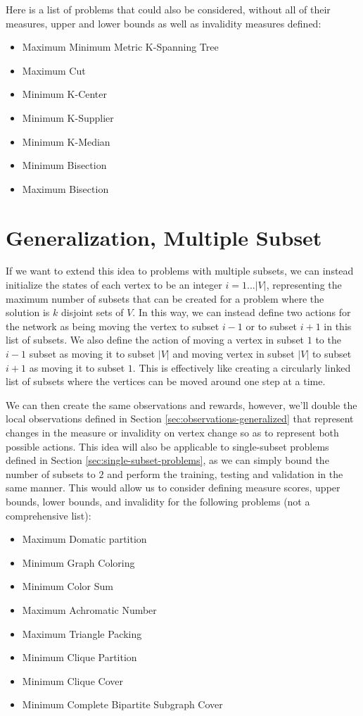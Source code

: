\documentclass{article}
\begin{document}
    Here is a list of problems that could also be considered, without all of their measures, upper and lower bounds as well as invalidity measures defined:
    \begin{itemize}
        \item Maximum Minimum Metric K-Spanning Tree 
        \item Maximum Cut 
        \item Minimum K-Center
        \item Minimum K-Supplier
        \item Minimum K-Median
        \item Minimum Bisection
        \item Maximum Bisection
    \end{itemize}

\section{Generalization, Multiple Subset}\label{sec:multi-subset}

If we want to extend this idea to problems with multiple subsets, we can instead initialize the states of each vertex to be an integer $i = 1 ... |V|$, representing the maximum number of subsets that can be created for a problem where the solution is $k$ disjoint sets of $V$. In this way, we can instead define two actions for the network as being moving the vertex to subset $i - 1$ or to subset $i + 1$ in this list of subsets. We also define the action of moving a vertex in subset $1$ to the $i - 1$ subset as moving it to subset $|V|$ and moving vertex in subset $|V|$ to subset $i+1$ as moving it to subset $1$. This is effectively like creating a circularly linked list of subsets where the vertices can be moved around one step at a time. 

We can then create the same observations and rewards, however, we'll double the local observations defined in Section \ref{sec:observations-generalized} that represent changes in the measure or invalidity on vertex change so as to represent both possible actions. This idea will also be applicable to single-subset problems defined in Section \ref{sec:single-subset-problems}, as we can simply bound the number of subsets to $2$ and perform the training, testing and validation in the same manner. This would allow us to consider defining measure scores, upper bounds, lower bounds, and invalidity for the following problems (not a comprehensive list):

\begin{itemize}
    \item Maximum Domatic partition
    \item Minimum Graph Coloring
    \item Minimum Color Sum 
    \item Maximum Achromatic Number 
    \item Maximum Triangle Packing
    \item Minimum Clique Partition
    \item Minimum Clique Cover
    \item Minimum Complete Bipartite Subgraph Cover 
\end{itemize}
\end{document}
